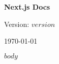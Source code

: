 \documentclass[11pt]{article}
\begin{document}
\begin{titlepage}
    \centering
    \vspace*{3cm}
    {\Huge\bfseries Next.js Docs \par}
    \vspace{1cm}
    {\Large Version: $version$ \par}
    \vspace{0.5cm}
    {\large \today \par}
    \vfill
\end{titlepage}

\tableofcontents
\newpage

$body$
\end{document}
